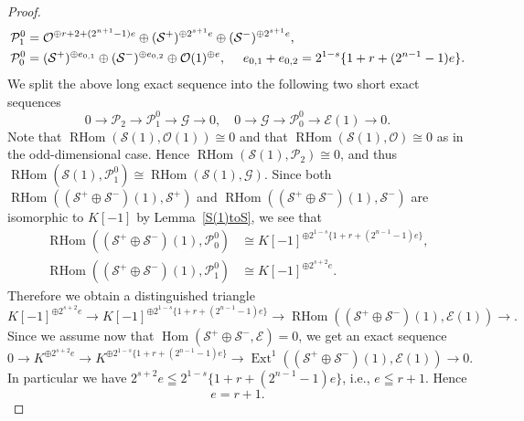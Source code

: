 \documentclass[a4paper,12pt]{amsart}
\DeclareMathOperator{\Hom}{Hom}
\DeclareMathOperator{\Ext}{Ext}
\DeclareMathOperator{\RHom}{RHom}
\begin{document}
\begin{proof}
\begin{equation*}
\begin{split}
\mathcal{P}^{0}_1&=\mathcal{O}^{\oplus r+2+(2^{n+1}-1)e}\oplus(\mathcal{S}^+)^{\oplus 2^{s+1}e}\oplus(\mathcal{S}^-)^{\oplus 2^{s+1}e},\\
\mathcal{P}^{0}_0&=(\mathcal{S}^+)^{\oplus e_{0,1}}\oplus(\mathcal{S}^-)^{\oplus e_{0,2}}\oplus \mathcal{O}(1)^{\oplus e},
\textrm{ \quad }e_{0,1}+e_{0,2}=2^{1-s}\{1+r+(2^{n-1}-1)e\}.
\end{split}
\end{equation*}
We split the above long exact sequence into the following two short exact sequences
\begin{equation*}
0
\to \mathcal{P}_2
\to \mathcal{P}^{0}_1
\to \mathcal{G}
\to 0, \quad
0
\to \mathcal{G}
\to \mathcal{P}^{0}_0
\to \mathcal{E}(1)\to 0.
\end{equation*}
Note that $\RHom(\mathcal{S}(1),\mathcal{O}(1))\cong 0$
and that 
$\RHom(\mathcal{S}(1),\mathcal{O})\cong 0$ as in the odd-dimensional case.
Hence $\RHom(\mathcal{S}(1),\mathcal{P}_2)\cong 0$, and thus 
$\RHom(\mathcal{S}(1),\mathcal{P}^0_1)\cong \RHom(\mathcal{S}(1),\mathcal{G})$.
Since both 
$\RHom((\mathcal{S}^+\oplus \mathcal{S}^-)(1),\mathcal{S}^+)$
and 
$\RHom((\mathcal{S}^+\oplus \mathcal{S}^-)(1),\mathcal{S}^-)$
are isomorphic to $K[-1]$
by Lemma~\ref{S(1)toS},
we see that 
\begin{equation*}
\begin{split}
\RHom((\mathcal{S}^+\oplus \mathcal{S}^-)(1),\mathcal{P}^{0}_0)
&
\cong K[-1]^{\oplus 2^{1-s}\{1+r+(2^{n-1}-1)e\}},
\\
\RHom((\mathcal{S}^+\oplus \mathcal{S}^-)(1),\mathcal{P}^{0}_1)
&
\cong K[-1]^{\oplus 2^{s+2}e}.
\end{split}
\end{equation*}
Therefore we obtain a distinguished triangle
\[
K[-1]^{\oplus 2^{s+2}e}
\to
K[-1]^{\oplus 2^{1-s}\{1+r+(2^{n-1}-1)e\}}
\to
\RHom((\mathcal{S}^+\oplus \mathcal{S}^-)(1),\mathcal{E}(1))
\to.
\]
Since we assume now that $\Hom (\mathcal{S}^+\oplus \mathcal{S}^-,\mathcal{E})=0$,
we get an exact sequence
\[
0
\to 
K^{\oplus 2^{s+2}e}
\to
K^{\oplus 2^{1-s}\{1+r+(2^{n-1}-1)e\}}
\to
\Ext^1((\mathcal{S}^+\oplus \mathcal{S}^-)(1),\mathcal{E}(1))
\to
0.
\]
In particular we have $2^{s+2}e\leqq 2^{1-s}\{1+r+(2^{n-1}-1)e\}$, i.e., $e\leqq r+1$.
Hence 
\[e=r+1.
\]
\end{proof}


%
%
%

\end{document}
